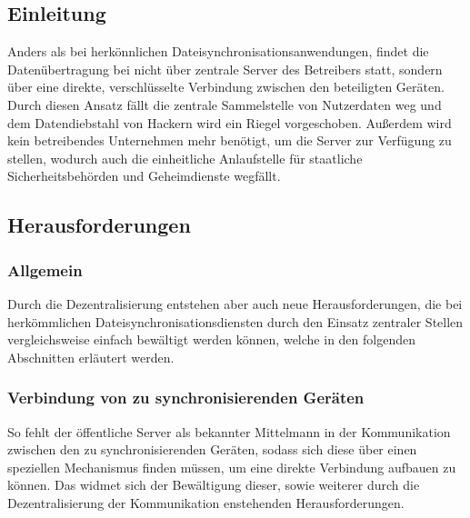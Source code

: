 \subsection{Einleitung}
Anders als bei herkönnlichen Dateisynchronisationsanwendungen, findet die
Datenübertragung bei \sblit nicht über zentrale Server des Betreibers statt,
sondern über eine direkte, verschlüsselte Verbindung zwischen den beteiligten
Geräten.
Durch diesen Ansatz fällt die zentrale Sammelstelle von Nutzerdaten
weg und dem Datendiebstahl von Hackern wird ein Riegel vorgeschoben. Außerdem
wird kein betreibendes Unternehmen mehr benötigt, um die Server zur Verfügung zu
stellen, wodurch auch die einheitliche Anlaufstelle für staatliche Sicherheitsbehörden
und Geheimdienste wegfällt.

\subsection{Herausforderungen}
\subsubsection{Allgemein}
Durch die Dezentralisierung entstehen aber auch neue Herausforderungen, die bei
herkömmlichen Dateisynchronisationsdiensten durch den Einsatz zentraler Stellen
vergleichsweise einfach bewältigt werden können, welche in den folgenden Abschnitten erläutert werden.

\subsubsection{Verbindung von zu synchronisierenden Geräten}
So fehlt der öffentliche Server als bekannter Mittelmann in der Kommunikation
zwischen den zu synchronisierenden Geräten, sodass sich diese über einen speziellen
Mechanismus finden müssen, um eine direkte Verbindung aufbauen zu können.
Das  widmet sich der Bewältigung dieser, sowie weiterer
durch die Dezentralisierung der Kommunikation enstehenden Herausforderungen.


